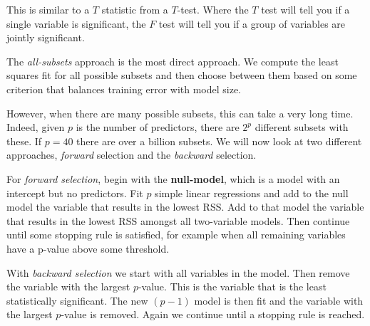 This is similar to a $T$ statistic from a $T$-test. Where the $T$ test will tell you if a single variable is significant, the $F$ test will tell you if a group of variables are jointly significant.

The \textit{all-subsets} approach is the most direct approach. We compute the least squares fit for all possible subsets and then choose between them based on some criterion that balances training error with model size.

However, when there are many possible subsets, this can take a very long time. Indeed, given $p$ is the number of predictors, there are $2^{p}$ different subsets with these. If $p = 40$ there are over a billion subsets. We will now look at two different approaches, \textit{forward} selection and the \textit{backward} selection.

For \textit{forward selection}, begin with the \textbf{null-model}, which is a model with an intercept but no predictors. Fit $p$ simple linear regressions and add to the null model the variable that results in the lowest RSS. Add to that model the variable that results in the lowest RSS amongst all two-variable models. Then continue until some stopping rule is satisfied, for example when all remaining variables have a p-value above some threshold.

With \textit{backward selection} we start with all variables in the model. Then remove the variable with the largest $p$-value. This is the variable that is the least statistically significant. The new $(p-1)$ model is then fit and the variable with the largest $p$-value is removed. Again we continue until a stopping rule is reached.






